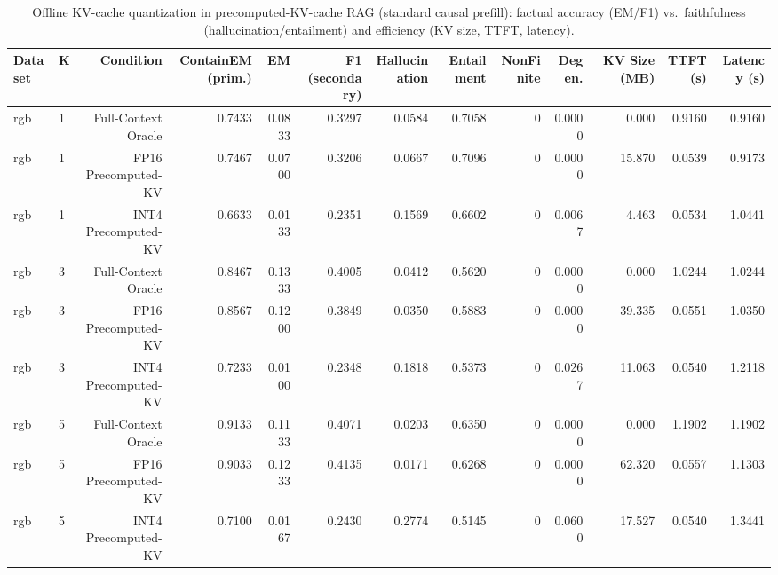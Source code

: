 \begin{table}[t]
\centering
\small
\begin{tabular}{llrrrrrrrrrrr}
\toprule
Dataset & K & Condition & ContainEM (prim.) & EM & F1 (secondary) & Hallucination & Entailment & NonFinite & Degen. & KV Size (MB) & TTFT (s) & Latency (s) \\
\midrule
rgb & 1 & Full-Context Oracle & 0.7433 & 0.0833 & 0.3297 & 0.0584 & 0.7058 & 0 & 0.0000 & 0.000 & 0.9160 & 0.9160 \\
rgb & 1 & FP16 Precomputed-KV & 0.7467 & 0.0700 & 0.3206 & 0.0667 & 0.7096 & 0 & 0.0000 & 15.870 & 0.0539 & 0.9173 \\
rgb & 1 & INT4 Precomputed-KV & 0.6633 & 0.0133 & 0.2351 & 0.1569 & 0.6602 & 0 & 0.0067 & 4.463 & 0.0534 & 1.0441 \\
rgb & 3 & Full-Context Oracle & 0.8467 & 0.1333 & 0.4005 & 0.0412 & 0.5620 & 0 & 0.0000 & 0.000 & 1.0244 & 1.0244 \\
rgb & 3 & FP16 Precomputed-KV & 0.8567 & 0.1200 & 0.3849 & 0.0350 & 0.5883 & 0 & 0.0000 & 39.335 & 0.0551 & 1.0350 \\
rgb & 3 & INT4 Precomputed-KV & 0.7233 & 0.0100 & 0.2348 & 0.1818 & 0.5373 & 0 & 0.0267 & 11.063 & 0.0540 & 1.2118 \\
rgb & 5 & Full-Context Oracle & 0.9133 & 0.1133 & 0.4071 & 0.0203 & 0.6350 & 0 & 0.0000 & 0.000 & 1.1902 & 1.1902 \\
rgb & 5 & FP16 Precomputed-KV & 0.9033 & 0.1233 & 0.4135 & 0.0171 & 0.6268 & 0 & 0.0000 & 62.320 & 0.0557 & 1.1303 \\
rgb & 5 & INT4 Precomputed-KV & 0.7100 & 0.0167 & 0.2430 & 0.2774 & 0.5145 & 0 & 0.0600 & 17.527 & 0.0540 & 1.3441 \\
\bottomrule
\end{tabular}
\caption{Offline KV-cache quantization in precomputed-KV-cache RAG (standard causal prefill): factual accuracy (EM/F1) vs.\ faithfulness (hallucination/entailment) and efficiency (KV size, TTFT, latency).}
\label{tab:main}
\end{table}
